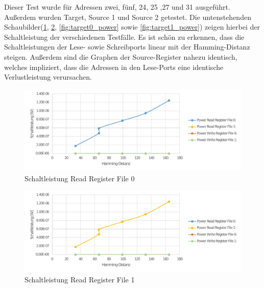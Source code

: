 Dieser Test wurde für Adressen zwei, fünf, 24, 25 ,27 und 31 ausgeführt. Außerdem wurden Target, Source 1 und Source 2 getestet. Die untenstehenden Schaubilder(\ref{fig:source0_power}, \ref{fig:source1_power}, \ref{fig:target0_power} sowie \ref{fig:target1_power}) zeigen hierbei der Schaltleistung der verschiedenen Testfälle. Es ist schön zu erkennen, dass die Schaltleistungen der Lese- sowie Schreibports linear mit der Hamming-Distanz steigen. Außerdem sind die Graphen der Source-Register nahezu identisch, welches impliziert, dass die Adressen in den Lese-Ports eine identische Verlustleistung verursachen.\\

\begin{figure}[H]
	\centering
	\includegraphics[width=\textwidth]{fig/source1_power.pdf}
	\caption{Schaltleistung Read Register File 0}
	\label{fig:source0_power}
\end{figure}
\begin{figure}[H]
	\centering
	\includegraphics[width=\textwidth]{fig/source2_power.pdf}
	\caption{Schaltleistung Read Register File 1}
	\label{fig:source1_power}
\end{figure}

